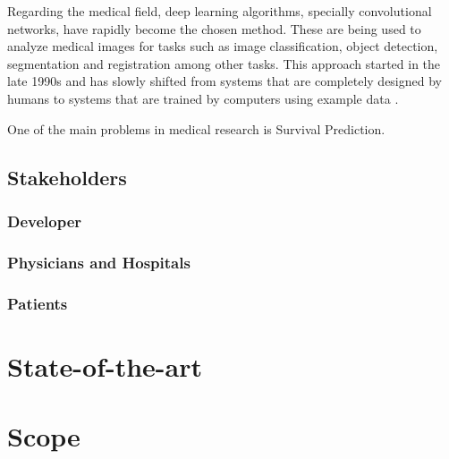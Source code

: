 \documentclass[a4paper]{article}
\begin{document}
Regarding the medical field, deep learning algorithms, specially convolutional networks, have 
rapidly become the chosen method. These are being used to analyze medical images for tasks such as
image classification, object detection, segmentation and registration among other tasks. This
approach started in the late 1990s and has slowly shifted from systems that are completely designed
by humans to systems that are trained by computers using example data
\cite{survey-deep-learning}.

One of the main problems in medical research is Survival Prediction.
\cite{DeepSurv}

\subsection{Stakeholders}

\subsubsection{Developer}
\subsubsection{Physicians and Hospitals}
\subsubsection{Patients}

\section{State-of-the-art}

\section{Scope}

\pagebreak
\printbibliography
\end{document}

